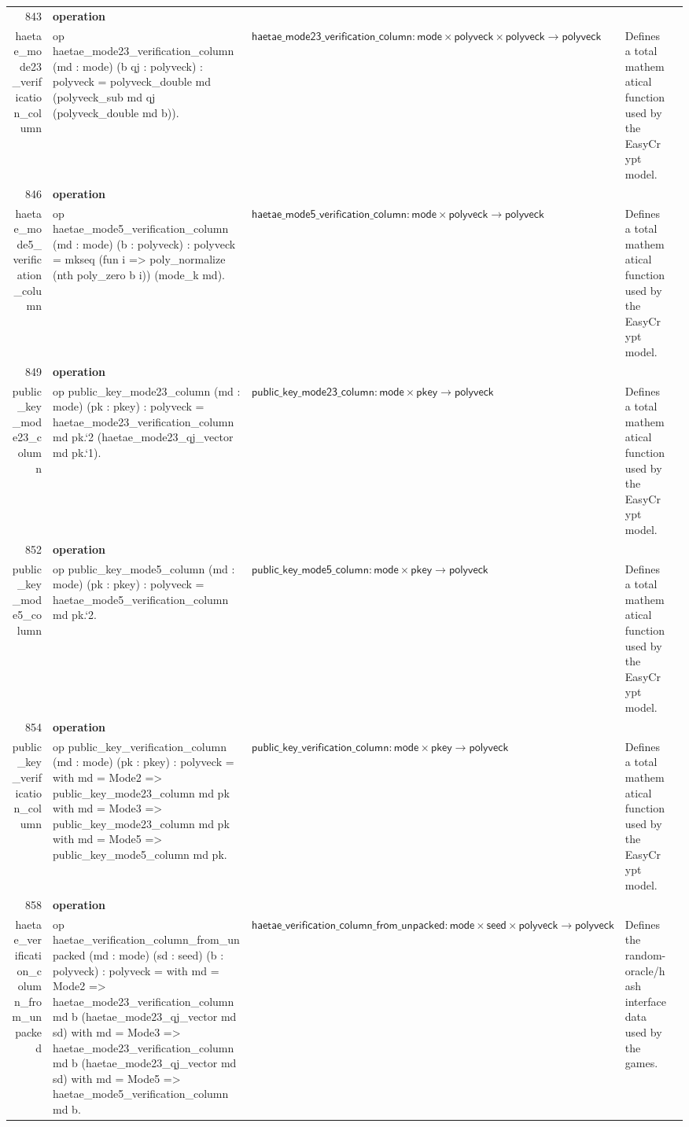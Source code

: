 \documentclass[10pt]{article}
\newcommand{\ec}[1]{\begingroup\ttfamily\scriptsize #1\endgroup}
\begin{document}
\begin{longtable}{r L{0.17\textwidth} L{0.26\textwidth} L{0.27\textwidth} L{0.20\textwidth}}
843 & \textbf{operation}\\\ec{haetae\_mode23\_verification\_column} & \ec{op haetae\_mode23\_verification\_column (md : mode) (b qj : polyveck) : polyveck = polyveck\_double md (polyveck\_sub md qj (polyveck\_double md b)).} & \(\mathsf{haetae\_mode23\_verification\_column} : \mathsf{mode} \times \mathsf{polyveck} \times \mathsf{polyveck} \to \mathsf{polyveck}\) & Defines a total mathematical function used by the EasyCrypt model. \\
846 & \textbf{operation}\\\ec{haetae\_mode5\_verification\_column} & \ec{op haetae\_mode5\_verification\_column (md : mode) (b : polyveck) : polyveck = mkseq (fun i => poly\_normalize (nth poly\_zero b i)) (mode\_k md).} & \(\mathsf{haetae\_mode5\_verification\_column} : \mathsf{mode} \times \mathsf{polyveck} \to \mathsf{polyveck}\) & Defines a total mathematical function used by the EasyCrypt model. \\
849 & \textbf{operation}\\\ec{public\_key\_mode23\_column} & \ec{op public\_key\_mode23\_column (md : mode) (pk : pkey) : polyveck = haetae\_mode23\_verification\_column md pk.`2 (haetae\_mode23\_qj\_vector md pk.`1).} & \(\mathsf{public\_key\_mode23\_column} : \mathsf{mode} \times \mathsf{pkey} \to \mathsf{polyveck}\) & Defines a total mathematical function used by the EasyCrypt model. \\
852 & \textbf{operation}\\\ec{public\_key\_mode5\_column} & \ec{op public\_key\_mode5\_column (md : mode) (pk : pkey) : polyveck = haetae\_mode5\_verification\_column md pk.`2.} & \(\mathsf{public\_key\_mode5\_column} : \mathsf{mode} \times \mathsf{pkey} \to \mathsf{polyveck}\) & Defines a total mathematical function used by the EasyCrypt model. \\
854 & \textbf{operation}\\\ec{public\_key\_verification\_column} & \ec{op public\_key\_verification\_column (md : mode) (pk : pkey) : polyveck = with md = Mode2 => public\_key\_mode23\_column md pk with md = Mode3 => public\_key\_mode23\_column md pk with md = Mode5 => public\_key\_mode5\_column md pk.} & \(\mathsf{public\_key\_verification\_column} : \mathsf{mode} \times \mathsf{pkey} \to \mathsf{polyveck}\) & Defines a total mathematical function used by the EasyCrypt model. \\
858 & \textbf{operation}\\\ec{haetae\_verification\_column\_from\_unpacked} & \ec{op haetae\_verification\_column\_from\_unpacked (md : mode) (sd : seed) (b : polyveck) : polyveck = with md = Mode2 => haetae\_mode23\_verification\_column md b (haetae\_mode23\_qj\_vector md sd) with md = Mode3 => haetae\_mode23\_verification\_column md b (haetae\_mode23\_qj\_vector md sd) with md = Mode5 => haetae\_mode5\_verification\_column md b.} & \(\mathsf{haetae\_verification\_column\_from\_unpacked} : \mathsf{mode} \times \mathsf{seed} \times \mathsf{polyveck} \to \mathsf{polyveck}\) & Defines the random-oracle/hash interface data used by the games. \\

\end{longtable}
\end{document}
